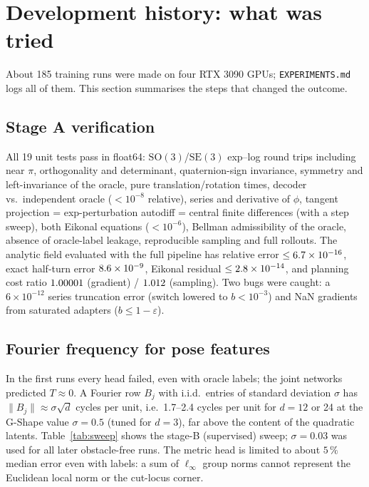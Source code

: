 \documentclass[11pt]{article}
\newcommand{\SO}{\mathrm{SO}(3)}
\newcommand{\SE}{\mathrm{SE}(3)}
\newcommand{\code}[1]{\texttt{#1}}
\newcommand{\pct}{\,\%}
\begin{document}
\section{Development history: what was tried}
\label{sec:history}

About 185 training runs were made on four RTX 3090 GPUs; \code{EXPERIMENTS.md} logs all of them.
This section summarises the steps that changed the outcome.

\subsection{Stage A verification}
\label{sec:stagea}
All 19 unit tests pass in float64: $\SO$/$\SE$ exp--log round trips including near $\pi$,
orthogonality and determinant, quaternion-sign invariance, symmetry and left-invariance of the
oracle, pure translation/rotation times, decoder vs.\ independent oracle ($<10^{-8}$ relative),
series and derivative of $\phi$, tangent projection = exp-perturbation autodiff = central finite
differences (with a step sweep), both Eikonal equations ($<10^{-6}$), Bellman admissibility of the
oracle, absence of oracle-label leakage, reproducible sampling and full rollouts. The analytic field
evaluated with the full pipeline has relative error $\le6.7\times10^{-16}$, exact half-turn error
$8.6\times10^{-9}$, Eikonal residual $\le2.8\times10^{-14}$, and planning cost ratio $1.00001$ (gradient)
/ $1.012$ (sampling). Two bugs were caught: a $6\times10^{-12}$ series truncation error (switch
lowered to $b<10^{-3}$) and NaN gradients from saturated adapters ($b\le1-\varepsilon$).

\subsection{Fourier frequency for pose features}

In the first runs every head failed, even with oracle labels; the joint networks predicted $T\approx0$.
A Fourier row $B_j$ with i.i.d.\ entries of standard deviation $\sigma$ has
$\|B_j\|\approx\sigma\sqrt d$ cycles per unit, i.e.\ 1.7--2.4 cycles per unit for $d=12$ or 24 at the
G-Shape value $\sigma=0.5$ (tuned for $d=3$), far above the content of the quadratic latents.
Table~\ref{tab:sweep} shows the stage-B (supervised) sweep; $\sigma=0.03$ was used for all later
obstacle-free runs. The metric head is limited to about $5\pct$ median error even with labels: a sum
of $\ell_\infty$ group norms cannot represent the Euclidean local norm or the cut-locus corner.
\end{document}
